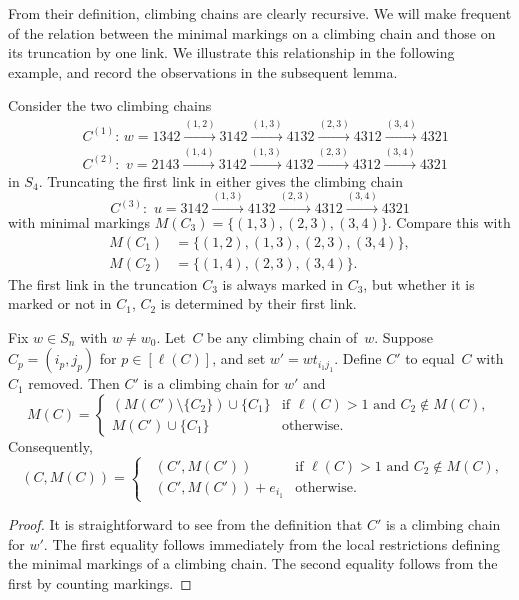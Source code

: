\documentclass[ALCO]{cedram}
\DeclareMathOperator{\dwt}{\overline{\mathrm{wt}}}
\begin{document}
From their definition, climbing chains are clearly recursive. We will make frequent of the relation between the minimal markings on a climbing chain and those on its truncation by one link. We illustrate this relationship in the following example, and record the observations in the subsequent lemma.
\begin{example}
	Consider the two climbing chains
	\begin{align*}
		&C^{(1)}:\, w=1342
		{\xrightarrow{(1,2)}} 3142
		{\xrightarrow{(1,3)}} 4132
		{\xrightarrow{(2,3)}} 4312
		{\xrightarrow{(3,4)}} 4321\\  
		&C^{(2)}:\,\,v=2143 
		{\xrightarrow{(1,4)}} 3142
		{\xrightarrow{(1,3)}} 4132
		{\xrightarrow{(2,3)}} 4312
		{\xrightarrow{(3,4)}} 4321
	\end{align*}
	in $S_4$. Truncating the first link in either gives the climbing chain
	\[
	C^{(3)}:\,\,u=3142  
	{\xrightarrow{(1,3)}} 4132
	{\xrightarrow{(2,3)}} 4312
	{\xrightarrow{(3,4)}} 4321
	\]
	with minimal markings $M(C_3) = \{(1,3),(2,3),(3,4)\}$. Compare this with 
	\begin{align*}
		M(C_1) &= \{(1,2),(1,3),(2,3),(3,4)\},\\
		M(C_2) &= \{(1,4),(2,3),(3,4)\}.
	\end{align*}
	The first link in the truncation $C_3$ is always marked in $C_3$, but whether it is marked or not in $C_1$, $C_2$ is determined by their first link.
\end{example}
\begin{lemma}
	\label{lem:markingrecursion}
	Fix $w\in S_n$ with $w\neq w_0$. Let~$C$ be any climbing chain of~$w$. Suppose $C_p=(i_p,j_p)$ for $p\in [\ell(C)]$, and set $w'=wt_{i_1j_1}$. Define $C'$ to equal~$C$ with $C_1$ removed. Then $C'$ is a climbing chain for $w'$ and 
	\[
	M(C) = 
	\begin{cases}
		(M(C')\setminus\{C_2\})\cup \{C_1\}&\mbox{if } \ell(C)>1 \mbox{ and }C_2\notin M(C),\\
		M(C')\cup \{C_1\}&\mbox{otherwise}.
	\end{cases} 
	\]		
	Consequently,
	\[
	\dwt(C,M(C)) = 
	\begin{cases}
		\dwt(C',M(C'))&\mbox{if } \ell(C)>1 \mbox{ and }C_2\notin M(C),\\
		\dwt(C',M(C'))+e_{i_1}&\mbox{otherwise}.
	\end{cases}
	\] 
\end{lemma}
\begin{proof}
	It is straightforward to see from the definition that $C'$ is a climbing chain for $w'$. 
	The first equality follows immediately from the local restrictions defining the minimal markings of a climbing chain. The second equality follows from the first by counting markings.
\end{proof}
\end{document}
